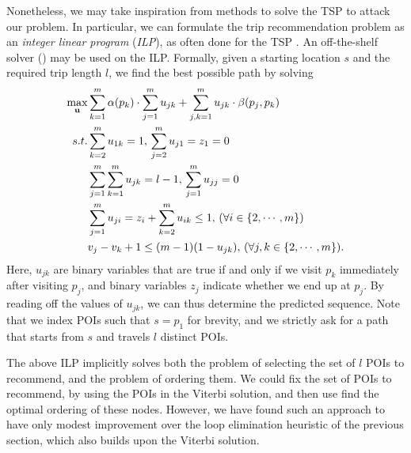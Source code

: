 Nonetheless, we may take inspiration from methods to solve the TSP to attack our problem.
In particular, 
we can formulate the trip recommendation problem as an \emph{integer linear program} (\emph{ILP}),
as often done for the TSP \citep{opt98}.
An off-the-shelf solver () may be used on the ILP.
Formally, given a starting location $s$ and the required trip length $l$,
we find the best possible path
by solving
\begin{align*}
\max_{\bu} & \sum_{k=1}^m \alpha( p_k ) \cdot \sum_{j=1}^m u_{jk} +
            \sum_{j,k=1}^m u_{jk} \cdot \beta( p_j, p_k ) \\
s.t. 
& \sum_{k=2}^m u_{1k} = 1, \, \sum_{j=2}^m u_{j1} = z_1=0  \\                %
& \sum_{j=1}^m \sum_{k=1}^m u_{jk} = l-1, \, \sum_{j=1}^m u_{jj}=0  \\      %
& \sum_{j=1}^m u_{ji} = z_i + \sum_{k=2}^m u_{ik} \le 1, \, (\forall i \in \{2,\cdots,m\})  \\ %
& v_j - v_k + 1 \le (m-1) (1-u_{jk}), \, (\forall j,k \in \{2,\cdots,m\}).                 %
\end{align*}
Here, $u_{jk}$ are binary variables that are true if and only if
we visit $p_k$ immediately after visiting $p_j$,
and binary variables $z_j$ indicate whether we end up at $p_j$.
By reading off the values of $u_{jk}$, we can thus determine the predicted sequence.
Note that we index POIs such that $s = p_1$ for brevity,
and we strictly ask for a path that starts from $s$ and travels $l$ distinct POIs.

The above ILP implicitly solves both the problem of selecting the set of $l$ POIs to recommend,
and the problem of ordering them.
We could fix the set of POIs to recommend, \eg by using the POIs in the Viterbi solution, and then use find the optimal ordering of these nodes.
However, we have found such an approach to have only modest improvement over the loop elimination heuristic of the previous section, which also builds upon the Viterbi solution.
